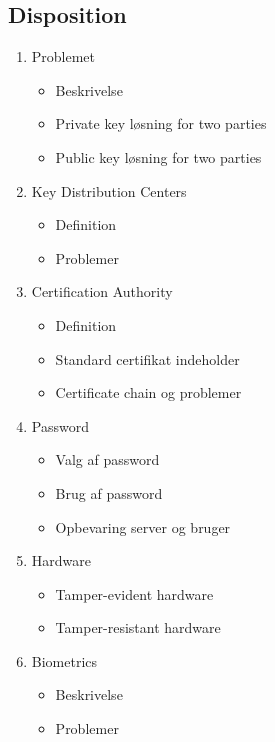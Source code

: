 \documentclass[a4, english]{article}
\begin{document}
\subsection{Disposition}
\begin{enumerate}
	\item Problemet
  \begin{itemize}
  	\item Beskrivelse 
    \item Private key løsning for two parties
    \item Public key løsning for two parties
  \end{itemize}
  \item Key Distribution Centers
  \begin{itemize}
  	\item Definition
    \item Problemer
  \end{itemize}
  \item Certification Authority
  \begin{itemize}
  	\item Definition
    \item Standard certifikat indeholder
    \item Certificate chain og problemer 
  \end{itemize}
  \item Password
  \begin{itemize}
  	\item Valg af password
    \item Brug af password
    \item Opbevaring server og bruger
  \end{itemize}
  \item Hardware
  \begin{itemize}
  	\item Tamper-evident hardware 
    \item Tamper-resistant hardware
  \end{itemize}
  \item Biometrics
  \begin{itemize}
  	\item Beskrivelse
    \item Problemer
  \end{itemize}
\end{enumerate}
\newpage
\end{document}
